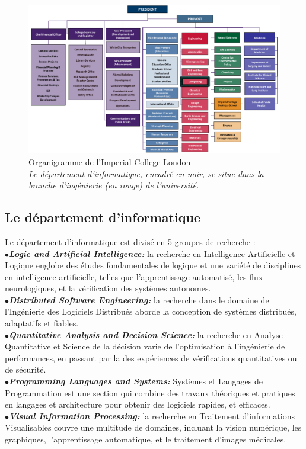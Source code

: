 \documentclass[10pt]{report}
\begin{document}
	\begin{figure}[h!]
		\begin{center}
			\includegraphics[width=17cm]{Reports/figures/College-Organisation.pdf}
		\end{center}
		\caption[Organigramme de l'Imperial College London]{Organigramme de l'Imperial College London \\ \textit{Le département d'informatique, encadré en noir, se situe dans la branche d'ingénierie (en rouge) de l'université.}}
		\label{Organigramme de l'Imperial College London}
	\end{figure}
	
	\subsection{Le département d'informatique}
	
	Le département d'informatique est divisé en 5 groupes de recherche : 
	\\{$\bullet$}\textit{\textbf{Logic and Artificial Intelligence:}} la recherche en Intelligence Artificielle et Logique englobe des études fondamentales de logique et une variété de disciplines en intelligence artificielle, telles que l'apprentissage automatisé, les flux neurologiques, et la vérification des systèmes autonomes.
	\\{$\bullet$}\textit{\textbf{Distributed Software Engineering:}} la recherche dans le domaine de l'Ingénierie des Logiciels Distribués aborde la conception de systèmes distribués, adaptatifs et fiables.
	\\{$\bullet$}\textit{\textbf{Quantitative Analysis and Decision Science:}} la recherche en Analyse Quantitative et Science de la décision varie de l'optimisation à l'ingénierie de performances, en passant par la des expériences de vérifications quantitatives ou de sécurité.
	\\{$\bullet$}\textit{\textbf{Programming Languages and Systems:}} Systèmes et Langages de Programmation est une section qui combine des travaux théoriques et pratiques en langages et architecture pour obtenir des logiciels rapides, et efficaces.
	\\{$\bullet$}\textit{\textbf{Visual Information Processing:}} la recherche en Traitement d'informations Visualisables couvre une multitude de domaines, incluant la vision numérique, les graphiques, l'apprentissage automatique, et le traitement d'images médicales.
	
\end{document}
